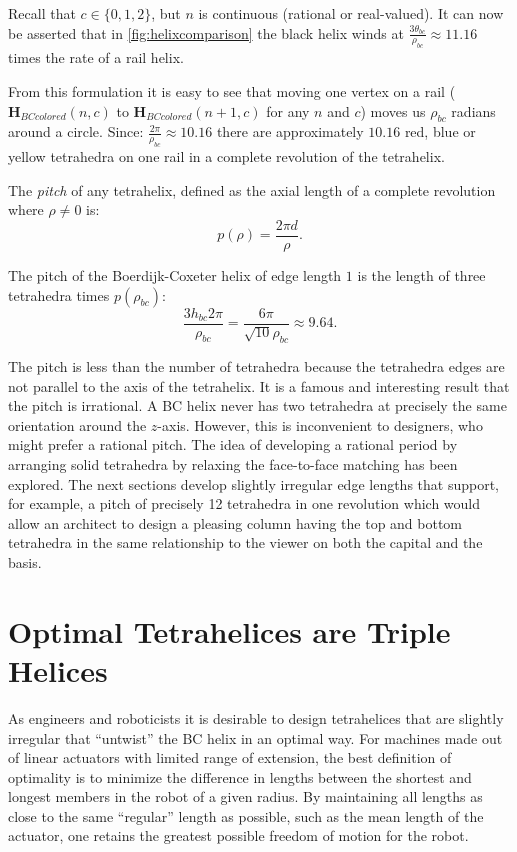 \documentclass[10pt,final]{journals-1.0/asme2ej}
\renewcommand{\vec}[1]{\mathbf{#1}}
\begin{document}
Recall that $c \in \{0,1,2\}$, but $n$ is continuous (rational or real-valued).
It can now be asserted that in \cref{fig:helixcomparison} the black helix winds at
$\frac{3 \theta_{bc}}{\rho_{bc}} \approx 11.16 $ times the rate of a rail helix.

From this formulation it is easy to see that moving one vertex on a rail
($\vec{H}_{BCcolored}(n,c)$ to $\vec{H}_{BCcolored}(n+1,c)$ for any $n$ and $c$)
moves us $\rho_{bc}$ radians around a circle. Since:
$ \frac{2 \pi}{\rho_{bc}} \approx 10.16 $
there are approximately $10.16$ red, blue or yellow tetrahedra on one rail in a
complete revolution of the tetrahelix.

The \emph{pitch} of any tetrahelix, defined as the axial length of a complete revolution
where $\rho \neq 0$ is:
\begin{equation}
  \label{pitcheqn}
p(\rho) = \frac{2 \pi  d}{\rho} \text{.}
\end{equation}

The pitch of the Boerdijk-Coxeter helix of edge length $1$ is the length of three tetrahedra times
$p(\rho_{bc})$:
\begin{equation}
   \frac{3 h_{bc}  2 \pi }{\rho_{bc}} 
   = \frac{6 \pi}{\sqrt{10}\rho_{bc}}
   \approx 9.64
 \text{.}
\end{equation}


The pitch is less than the number of tetrahedra because the tetrahedra
edges are not parallel to the axis of the tetrahelix.  It is a famous and interesting result
that the pitch is irrational. A BC helix never has two tetrahedra at
precisely the same orientation around the $z$-axis. However, this is
inconvenient to designers, who might prefer a rational pitch.
The idea of developing a rational period by arranging solid tetrahedra by relaxing
the face-to-face matching
has been explored\cite{sadler2013periodic}. 
The next sections develop slightly irregular edge lengths that support, for example,
a pitch of precisely 12
tetrahedra in one revolution which would allow an architect to
design a pleasing column having the top and bottom tetrahedra in the same relationship to the
viewer on both the capital and the basis.



\section{Optimal Tetrahelices are Triple Helices}

As engineers and roboticists it is desirable to design tetrahelices that
are slightly irregular that ``untwist'' the BC helix in an optimal way.
For machines
made out of linear actuators with limited range of extension,
the best definition of optimality is to minimize the difference in
lengths between the shortest and longest members in the robot of a given radius.
By maintaining all lengths as close to the same ``regular'' length as possible,
such as the mean length of the actuator,
one retains the greatest possible freedom of motion for the robot.
\end{document}
